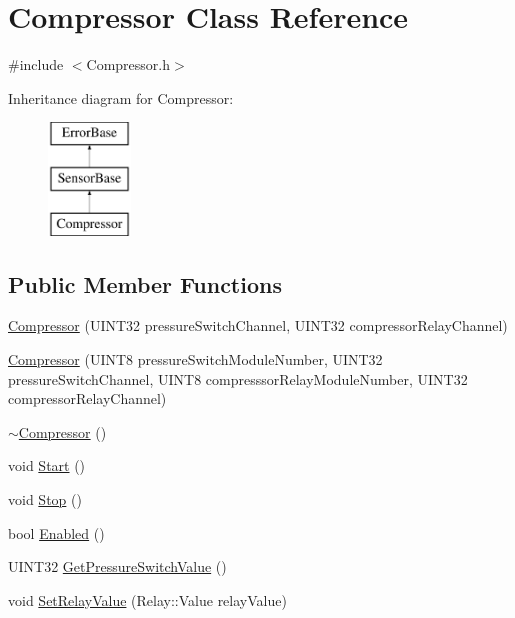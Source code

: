 \hypertarget{classCompressor}{
\section{Compressor Class Reference}
\label{classCompressor}
}


{\ttfamily \#include $<$Compressor.h$>$}

Inheritance diagram for Compressor:\begin{figure}[H]
\begin{center}
\leavevmode
\includegraphics[height=3.000000cm]{classCompressor}
\end{center}
\end{figure}
\subsection*{Public Member Functions}
\begin{DoxyCompactItemize}
\item 
\hyperlink{classCompressor_af1a57848f4a733fe30f555f700d5ce8b}{Compressor} (UINT32 pressureSwitchChannel, UINT32 compressorRelayChannel)
\item 
\hyperlink{classCompressor_ad02e2192f7d7afc598c7ecb6c3f5f9cc}{Compressor} (UINT8 pressureSwitchModuleNumber, UINT32 pressureSwitchChannel, UINT8 compresssorRelayModuleNumber, UINT32 compressorRelayChannel)
\item 
\hyperlink{classCompressor_a7153be4a80054c7da7b355ff6841c0f7}{$\sim$Compressor} ()
\item 
void \hyperlink{classCompressor_a710bb74699442b508062a109ed24e6a0}{Start} ()
\item 
void \hyperlink{classCompressor_a293182b6bfc18782b29deb8d7a99ff40}{Stop} ()
\item 
bool \hyperlink{classCompressor_a951cf9c276faa926510bf7b368efdef8}{Enabled} ()
\item 
UINT32 \hyperlink{classCompressor_a085220e028ebdd0bca7a3df2c5081478}{GetPressureSwitchValue} ()
\item 
void \hyperlink{classCompressor_afc6d48dce81c1c8a3d14c5da4c8cde99}{SetRelayValue} (Relay::Value relayValue)
\end{DoxyCompactItemize}


